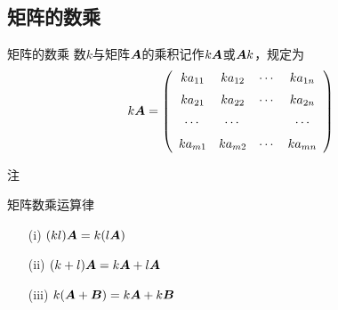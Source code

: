 \subsection{矩阵的数乘}
\begin{frame}
  \begin{footnotesize}
    \begin{block}{矩阵的数乘}
      数$k$与矩阵$\boldsymbol{A}$的乘积记作$k \boldsymbol{A}$或$\boldsymbol{A} k$，规定为
      $$
      k \boldsymbol{A} = 
      \left(
        \begin{array}{cccc}
          k a_{11}   & k a_{12}   & \cdots & k a_{1n}  \\[0.2cm]
          k a_{21}   & k a_{22}   & \cdots & k a_{2n}  \\[0.2cm]
          \cdots     & \cdots     &     & \cdots    \\[0.2cm]
          k a_{m1}   & k a_{m2}   & \cdots & k a_{mn}  
        \end{array}
      \right)
      $$
    \end{block}
    \pause 
    \begin{block}{注}
    \end{block}
  \end{footnotesize}
\end{frame}


\begin{frame}
  \begin{footnotesize}
    \begin{block}{矩阵数乘运算律}
      \begin{itemize}
      \item[(i)] $(k l)\boldsymbol{A} =  k(l \boldsymbol{A})$\\[0.2cm]
      \item[(ii)] $(k + l) \boldsymbol{A}  = k \boldsymbol{A} + l \boldsymbol{A}$\\[0.2cm]
      \item[(iii)] $k (\boldsymbol{A} + \boldsymbol{B})  = k \boldsymbol{A} + k \boldsymbol{B}$
      \end{itemize}
    \end{block}
    \pause 
  \end{footnotesize}
\end{frame}


